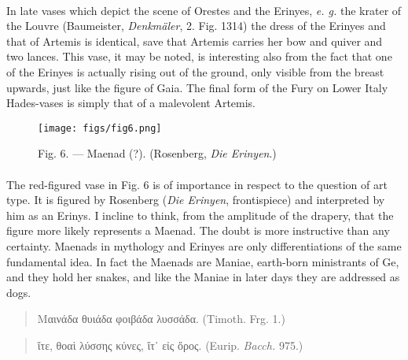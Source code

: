 \documentclass[a4paper, 11pt, oneside, polutonikogreek, english]{article}
\begin{document}
\paragraph{}
In late vases which depict the scene of Orestes and the Erinyes, \emph{e. g.} the krater of the Louvre (Baumeister, \emph{Denkmäler}, 2. Fig. 1314) the dress of the Erinyes and that of Artemis is identical, save that Artemis carries her bow and quiver and two lances. This vase, it may be noted, is interesting also from the fact that one of the Erinyes is actually rising out of the ground, only visible from the breast upwards, just like the figure of Gaia. The final form of the Fury on Lower Italy Hades-vases is simply that of a malevolent Artemis.
\begin{figure}[H]
\centering
\texttt{[image: figs/fig6.png]}
\caption{\Fontauri Fig. 6. --- Maenad (?). (Rosenberg, \emph{Die Erinyen}.)}
\end{figure}
\paragraph{}
The red-figured vase in Fig. 6 is of importance in respect to the question of art type. It is figured by Rosenberg (\emph{Die Erinyen}, frontispiece) and interpreted by him as an Erinys. I incline to think, from the amplitude of the drapery, that the figure more likely represents a Maenad. The doubt is more instructive than any certainty. Maenads in mythology and Erinyes are only differentiations of the same fundamental idea. In fact the Maenads are Maniae, earth-born ministrants of Ge, and they hold her snakes, and like the Maniae in later days they are addressed as dogs.
\begin{quotation}
Μαινάδα θυιάδα φοιβάδα λυσσάδα. (Timoth. Frg. 1.)
\end{quotation}
\begin{quotation}
ἴτε, θοαὶ λύσσης κύνες, ἴτ᾽ εἰς ὄρος. (Eurip. \emph{Bacch.} 975.)
\end{quotation}
\end{document}
